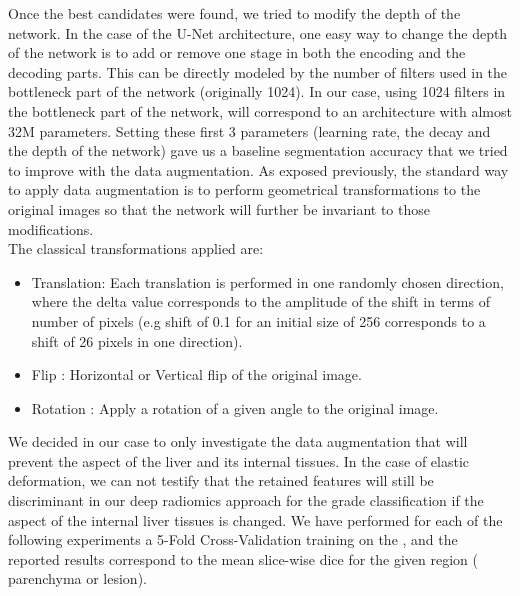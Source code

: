 Once the best candidates were found, we tried to modify the depth of the
network. In the case of the U-Net architecture, one easy way to change
the depth of the network is to add or remove one stage in both the
encoding and the decoding parts. This can be directly modeled by the
number of filters used in the bottleneck part of the network (originally
1024).
In our case, using 1024 filters in the bottleneck part of the network,
will correspond to an architecture with almost 32M parameters.
Setting these first 3 parameters (learning rate, the decay and the depth
of the network) gave us a baseline segmentation accuracy that we tried
to improve with the data augmentation.
As exposed previously, the standard way to apply data augmentation is to
perform geometrical transformations to the original images so that the
network will further be invariant to those modifications.\\
The classical transformations applied are:

\begin{itemize}
\item Translation: Each translation is performed in one randomly chosen
  direction, where the delta value corresponds to the amplitude of the
  shift in terms of number of pixels (e.g shift of 0.1 for an initial
  size of 256 corresponds to a shift of 26 pixels in one direction).
\item Flip : Horizontal or Vertical flip of the original image.
\item Rotation : Apply a rotation of a given angle to the original image.
\end{itemize}

We decided in our case to only investigate the data augmentation that
will prevent the aspect of the liver and its internal tissues. In the
case of elastic deformation, we can not testify that the retained
features will still be discriminant in our deep radiomics approach for
the grade classification if the aspect of the internal liver tissues is
changed.
We have performed for each of the following experiments a 5-Fold
Cross-Validation training on the , and the reported results
correspond to the mean slice-wise dice for the given region (
parenchyma or lesion). 



